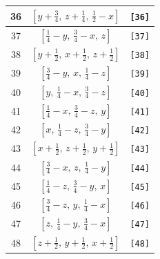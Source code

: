 \documentclass[fleqn,8pt]{jsarticle}
\begin{document}
\begin{longtable}{ccc}
36 & $\left[ y + \frac{3}{4},\, z + \frac{1}{4},\, \frac{1}{2} - x \right]$ & {\tt [36]} \\ \hline
37 & $\left[ \frac{1}{4} - y,\, \frac{3}{4} - x,\, z \right]$ & {\tt [37]} \\ \hline
38 & $\left[ y + \frac{1}{2},\, x + \frac{1}{2},\, z + \frac{1}{2} \right]$ & {\tt [38]} \\ \hline
39 & $\left[ \frac{3}{4} - y,\, x,\, \frac{1}{4} - z \right]$ & {\tt [39]} \\ \hline
40 & $\left[ y,\, \frac{1}{4} - x,\, \frac{3}{4} - z \right]$ & {\tt [40]} \\ \hline
41 & $\left[ \frac{1}{4} - x,\, \frac{3}{4} - z,\, y \right]$ & {\tt [41]} \\ \hline
42 & $\left[ x,\, \frac{1}{4} - z,\, \frac{3}{4} - y \right]$ & {\tt [42]} \\ \hline
43 & $\left[ x + \frac{1}{2},\, z + \frac{1}{2},\, y + \frac{1}{2} \right]$ & {\tt [43]} \\ \hline
44 & $\left[ \frac{3}{4} - x,\, z,\, \frac{1}{4} - y \right]$ & {\tt [44]} \\ \hline
45 & $\left[ \frac{1}{4} - z,\, \frac{3}{4} - y,\, x \right]$ & {\tt [45]} \\ \hline
46 & $\left[ \frac{3}{4} - z,\, y,\, \frac{1}{4} - x \right]$ & {\tt [46]} \\ \hline
47 & $\left[ z,\, \frac{1}{4} - y,\, \frac{3}{4} - x \right]$ & {\tt [47]} \\ \hline
48 & $\left[ z + \frac{1}{2},\, y + \frac{1}{2},\, x + \frac{1}{2} \right]$ & {\tt [48]} \\
\end{longtable}
\end{document}
